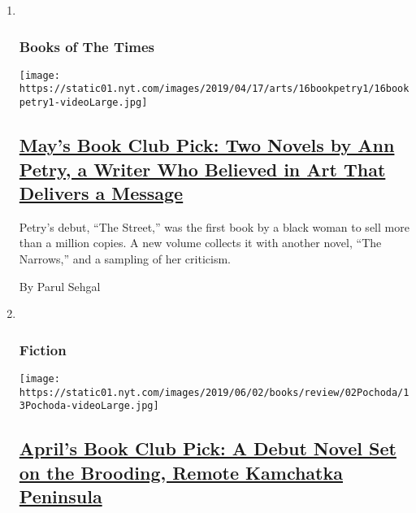 \begin{enumerate}
\def\labelenumi{\arabic{enumi}.}
\item ~
  \hypertarget{books-of-the-times}{%
  \subsubsection{Books of The Times}\label{books-of-the-times}}

  \texttt{[image: https://static01.nyt.com/images/2019/04/17/arts/16bookpetry1/16bookpetry1-videoLarge.jpg]}

  \hypertarget{mays-book-club-pick-two-novels-by-ann-petry-a-writer-who-believed-in-art-that-delivers-a-message}{%
  \subsection{\texorpdfstring{\href{/2019/04/16/books/review-street-narrows-ann-petry.html}{May's
  Book Club Pick: Two Novels by Ann Petry, a Writer Who Believed in Art
  That Delivers a
  Message}}{May's Book Club Pick: Two Novels by Ann Petry, a Writer Who Believed in Art That Delivers a Message}}\label{mays-book-club-pick-two-novels-by-ann-petry-a-writer-who-believed-in-art-that-delivers-a-message}}

  Petry's debut, ``The Street,'' was the first book by a black woman to
  sell more than a million copies. A new volume collects it with another
  novel, ``The Narrows,'' and a sampling of her criticism.

  By Parul Sehgal
\item ~
  \hypertarget{fiction-1}{%
  \subsubsection{Fiction}\label{fiction-1}}

  \texttt{[image: https://static01.nyt.com/images/2019/06/02/books/review/02Pochoda/13Pochoda-videoLarge.jpg]}

  \hypertarget{aprils-book-club-pick-a-debut-novel-set-on-the-brooding-remote-kamchatka-peninsula}{%
  \subsection{\texorpdfstring{\href{/2019/05/14/books/review/disappearing-earth-julia-phillips.html}{April's
  Book Club Pick: A Debut Novel Set on the Brooding, Remote Kamchatka
  Peninsula}}{April's Book Club Pick: A Debut Novel Set on the Brooding, Remote Kamchatka Peninsula}}\label{aprils-book-club-pick-a-debut-novel-set-on-the-brooding-remote-kamchatka-peninsula}}


\end{enumerate}
